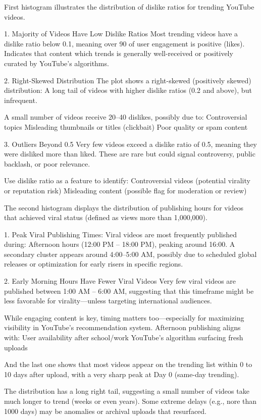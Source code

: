 \documentclass[a4paper]{article}
\begin{document}
\begin{multicols}{2} 

First histogram illustrates the distribution of dislike ratios for trending YouTube videos.

1. Majority of Videos Have Low Dislike Ratios
Most trending videos have a dislike ratio below 0.1, meaning over 90 of user engagement is positive (likes).
Indicates that content which trends is generally well-received or positively curated by YouTube’s algorithms.

2. Right-Skewed Distribution
The plot shows a right-skewed (positively skewed) distribution:
A long tail of videos with higher dislike ratios (0.2 and above), but infrequent.

A small number of videos receive 20–40 dislikes, possibly due to:
Controversial topics
Misleading thumbnails or titles (clickbait)
Poor quality or spam content

3. Outliers Beyond 0.5
Very few videos exceed a dislike ratio of 0.5, meaning they were disliked more than liked.
These are rare but could signal controversy, public backlash, or poor relevance.

Use dislike ratio as a feature to identify:
Controversial videos (potential virality or reputation risk)
Misleading content (possible flag for moderation or review)



The second histogram displays the distribution of publishing hours for videos that achieved viral status (defined as views more than 1,000,000).

1. Peak Viral Publishing Times:
Viral videos are most frequently published during:
Afternoon hours (12:00 PM – 18:00 PM), peaking around 16:00.
A secondary cluster appears around 4:00–5:00 AM, possibly due to scheduled global releases or optimization for early risers in specific regions.

2. Early Morning Hours Have Fewer Viral Videos
Very few viral videos are published between 1:00 AM – 6:00 AM, suggesting that this timeframe might be less favorable for virality—unless targeting international audiences.

While engaging content is key, timing matters too—especially for maximizing visibility in YouTube’s recommendation system. Afternoon publishing aligns with:
User availability after school/work
YouTube's algorithm surfacing fresh uploads



And the last one shows that most videos appear on the trending list within 0 to 10 days after upload, with a very sharp peak at Day 0 (same-day trending).

The distribution has a long right tail, suggesting a small number of videos take much longer to trend (weeks or even years).
Some extreme delays (e.g., nore than 1000 days) may be anomalies or archival uploads that resurfaced.



\end{multicols}
\end{document}
